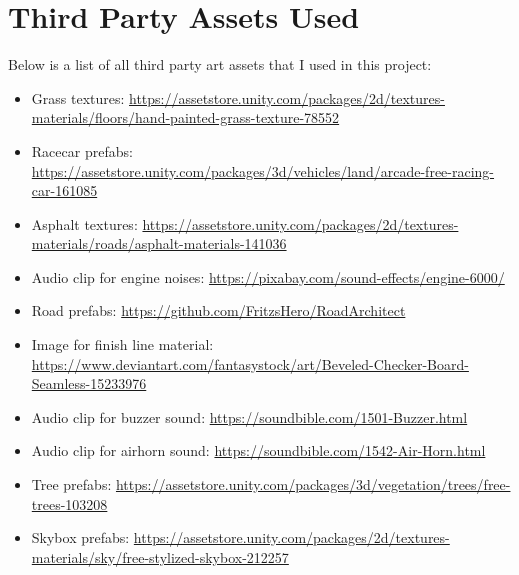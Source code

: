\documentclass[a4paper,11pt]{article}
\begin{document}
\section{Third Party Assets Used}
Below is a list of all third party art assets that I used in this project:
\begin{itemize}
    \item   Grass textures: \url{https://assetstore.unity.com/packages/2d/textures-materials/floors/hand-painted-grass-texture-78552}
    \item   Racecar prefabs: \url{https://assetstore.unity.com/packages/3d/vehicles/land/arcade-free-racing-car-161085}
    \item   Asphalt textures: \url{https://assetstore.unity.com/packages/2d/textures-materials/roads/asphalt-materials-141036}
    \item   Audio clip for engine noises: \url{https://pixabay.com/sound-effects/engine-6000/}
    \item   Road prefabs: \url{https://github.com/FritzsHero/RoadArchitect}
    \item   Image for finish line material: \url{https://www.deviantart.com/fantasystock/art/Beveled-Checker-Board-Seamless-15233976}
    \item   Audio clip for buzzer sound: \url{https://soundbible.com/1501-Buzzer.html}
    \item   Audio clip for airhorn sound: \url{https://soundbible.com/1542-Air-Horn.html}
    \item   Tree prefabs: \url{https://assetstore.unity.com/packages/3d/vegetation/trees/free-trees-103208}
    \item   Skybox prefabs: \url{https://assetstore.unity.com/packages/2d/textures-materials/sky/free-stylized-skybox-212257}
\end{itemize}
\end{document}

